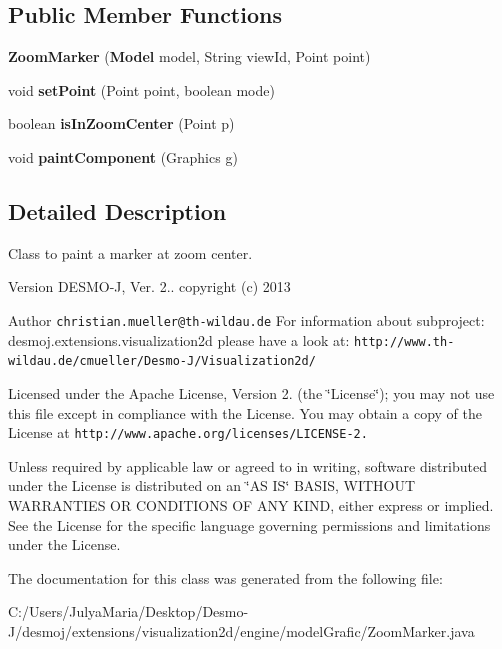 \subsection*{Public Member Functions}
\begin{DoxyCompactItemize}
\item 
{\bfseries Zoom\-Marker} ({\bf Model} model, String view\-Id, Point point)\label{classdesmoj_1_1extensions_1_1visualization2d_1_1engine_1_1model_grafic_1_1_zoom_marker_a5d723c0d55739a5a7b775721449c5cd0}

\item 
void {\bfseries set\-Point} (Point point, boolean mode)\label{classdesmoj_1_1extensions_1_1visualization2d_1_1engine_1_1model_grafic_1_1_zoom_marker_a69be4a87647ab9fe7dbcd9f10226d7aa}

\item 
boolean {\bfseries is\-In\-Zoom\-Center} (Point p)\label{classdesmoj_1_1extensions_1_1visualization2d_1_1engine_1_1model_grafic_1_1_zoom_marker_ab517400d92db120e0710e3f8f7c2c5e4}

\item 
void {\bfseries paint\-Component} (Graphics g)\label{classdesmoj_1_1extensions_1_1visualization2d_1_1engine_1_1model_grafic_1_1_zoom_marker_af5f6e93a832f4efda07807ae51001146}

\end{DoxyCompactItemize}


\subsection{Detailed Description}
Class to paint a marker at zoom center.

\begin{DoxyVersion}{Version}
D\-E\-S\-M\-O-\/\-J, Ver. 2.. copyright (c) 2013 
\end{DoxyVersion}
\begin{DoxyAuthor}{Author}
{\tt christian.\-mueller@th-\/wildau.\-de} For information about subproject\-: desmoj.\-extensions.\-visualization2d please have a look at\-: {\tt http\-://www.\-th-\/wildau.\-de/cmueller/\-Desmo-\/\-J/\-Visualization2d/}
\end{DoxyAuthor}
Licensed under the Apache License, Version 2. (the \char`\"{}\-License\char`\"{}); you may not use this file except in compliance with the License. You may obtain a copy of the License at {\tt http\-://www.\-apache.\-org/licenses/\-L\-I\-C\-E\-N\-S\-E-\/2.}

Unless required by applicable law or agreed to in writing, software distributed under the License is distributed on an \char`\"{}\-A\-S I\-S\char`\"{} B\-A\-S\-I\-S, W\-I\-T\-H\-O\-U\-T W\-A\-R\-R\-A\-N\-T\-I\-E\-S O\-R C\-O\-N\-D\-I\-T\-I\-O\-N\-S O\-F A\-N\-Y K\-I\-N\-D, either express or implied. See the License for the specific language governing permissions and limitations under the License. 

The documentation for this class was generated from the following file\-:\begin{DoxyCompactItemize}
\item 
C\-:/\-Users/\-Julya\-Maria/\-Desktop/\-Desmo-\/\-J/desmoj/extensions/visualization2d/engine/model\-Grafic/Zoom\-Marker.\-java\end{DoxyCompactItemize}
